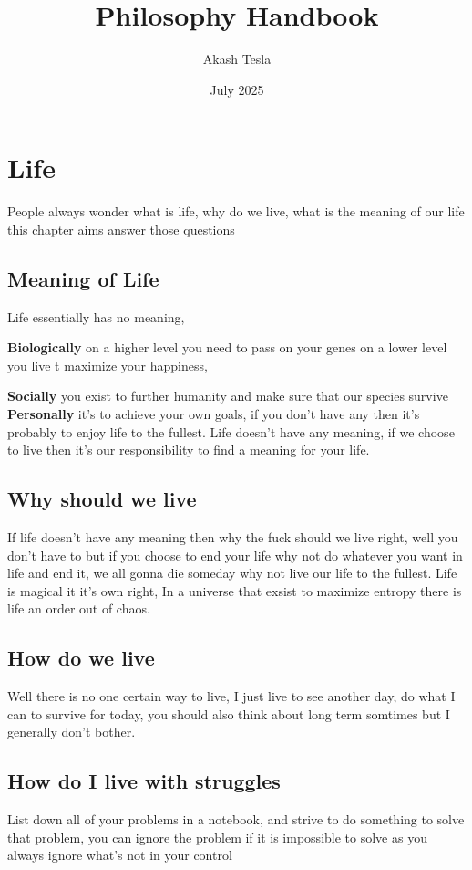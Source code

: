 \documentclass[12pt]{extarticle}
\title{Philosophy Handbook}
\author{Akash Tesla}
\date{July 2025}
\begin{document}
\tableofcontents
\newpage
\maketitle

\section{Life}
People always wonder what is life, why do we live, what is the meaning of our life this chapter 
aims answer those questions

\subsection{Meaning of Life}
Life essentially has no meaning,

\textbf{Biologically} on a higher level you need to pass on your genes on a lower level you live t
maximize your happiness,

\textbf{Socially} you exist to further humanity and make sure that our species survive\\

\textbf{Personally} it's to achieve your own goals, if you don't have any then it's probably to
enjoy life to the fullest. Life doesn't have any meaning, if we choose to live then it's our 
responsibility to find a meaning for your life.

\subsection{Why should we live}
If life doesn't have any meaning then why the fuck should we live right, well you don't have to
but if you choose to end your life why not do whatever you want in life and end it, we all gonna
die someday why not live our life to the fullest. Life is magical it it's own right, In a universe
that exsist to maximize entropy there is life an order out of chaos.

\subsection{How do we live}
Well there is no one certain way to live, I just live to see another day, do what I can to survive
for today, you should also think about long term somtimes but I generally don't bother.

\subsection{How do I live with struggles}
List down all of your problems in a notebook, and strive to do something to solve that problem, you
can ignore the problem if it is impossible to solve as you always ignore what's not in your control
\end{document}
